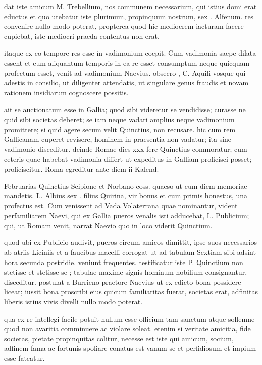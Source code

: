  dat iste amicum M. Trebellium, nos communem necessarium, qui istius domi erat eductus et quo utebatur iste plurimum, propinquum nostrum, sex . Alfenum. res convenire nullo modo poterat, propterea quod hic mediocrem iacturam facere cupiebat, iste mediocri praeda contentus non erat.

 itaque ex eo tempore res esse in vadimonium coepit. Cum vadimonia saepe dilata essent et cum aliquantum temporis in ea re esset consumptum neque quicquam profectum esset, venit ad vadimonium Naevius. obsecro , C. Aquili vosque qui adestis in consilio, ut diligenter attendatis, ut singulare genus fraudis et novam rationem insidiarum cognoscere possitis.

 ait se auctionatum esse in Gallia; quod sibi videretur se vendidisse; curasse ne quid sibi societas deberet; se iam neque vadari amplius neque vadimonium promittere; si quid agere secum velit Quinctius, non recusare. hic cum rem Gallicanam cuperet revisere, hominem in praesentia non vadatur; ita sine vadimonio disceditur. deinde Romae dies xxx fere Quinctius commoratur; cum ceteris quae habebat vadimonia differt ut expeditus in Galliam proficisci posset; proficiscitur. Roma egreditur ante diem ii Kalend.

 Februarias Quinctius Scipione et Norbano coss. quaeso ut eum diem memoriae mandetis. L. Albius sex . filius Quirina, vir bonus et cum primis honestus, una profectus est. Cum venissent ad Vada Volaterrana quae nominantur, vident perfamiliarem Naevi, qui ex Gallia pueros venalis isti adducebat, L. Publicium; qui, ut Romam venit, narrat Naevio quo in loco viderit Quinctium.

 quod ubi ex Publicio audivit, pueros circum amicos dimittit, ipse suos necessarios ab atriis Liciniis et a faucibus macelli corrogat ut ad tabulam Sextiam sibi adsint hora secunda postridie. veniunt frequentes. testificatur iste P. Quinctium non stetisse et stetisse se ; tabulae maxime signis hominum nobilium consignantur, disceditur. postulat a Burrieno praetore Naevius ut ex edicto bona possidere liceat; iussit bona proscribi eius quicum familiaritas fuerat, societas erat, adfinitas liberis istius vivis divelli nullo modo poterat.

 qua ex re intellegi facile potuit nullum esse officium tam sanctum atque sollemne quod non avaritia comminuere ac violare soleat. etenim si veritate amicitia, fide societas, pietate propinquitas colitur, necesse est iste qui amicum, socium, adfinem fama ac fortunis spoliare conatus est vanum se et perfidiosum et impium esse fateatur.

